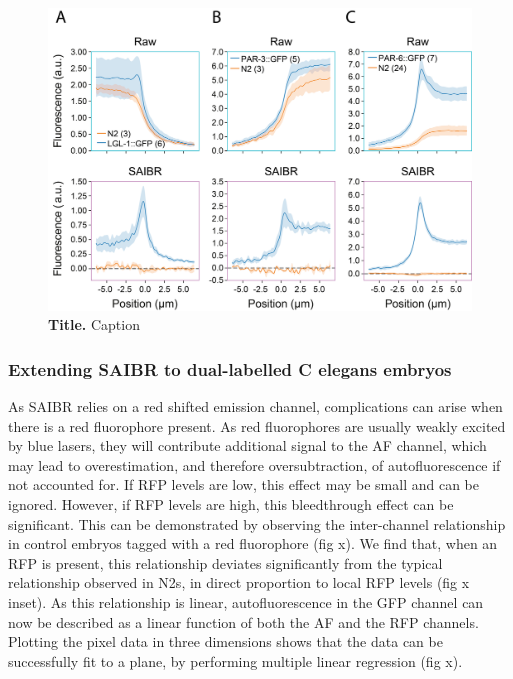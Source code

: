 \documentclass[12pt]{"article"}
\newcommand{\mycaption}[2]{\caption[#1]{\textbf{#1.} #2}}
\begin{document}


\begin{figure}[!h]
\includegraphics[scale=1]{saibr_membrane_profiles}
\setlength{\abovecaptionskip}{20pt}
\centering
\mycaption{Title}{Caption}
\end{figure}

\subsubsection{Extending SAIBR to dual-labelled C elegans embryos}

As SAIBR relies on a red shifted emission channel, complications can arise when there is a red fluorophore present. As red fluorophores are usually weakly excited by blue lasers, they will contribute additional signal to the AF channel, which may lead to overestimation, and therefore oversubtraction, of autofluorescence if not accounted for. If RFP levels are low, this effect may be small and can be ignored. However, if RFP levels are high, this bleedthrough effect can be significant. This can be demonstrated by observing the inter-channel relationship in control embryos tagged with a red fluorophore (fig x). We find that, when an RFP is present, this relationship deviates significantly from the typical relationship observed in N2s, in direct proportion to local RFP levels (fig x inset). As this relationship is linear, autofluorescence in the GFP channel can now be described as a linear function of both the AF and the RFP channels. Plotting the pixel data in three dimensions shows that the data can be successfully fit to a plane, by performing multiple linear regression (fig x). \\
\end{document}
